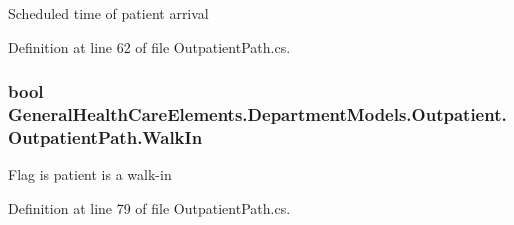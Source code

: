 Scheduled time of patient arrival 



Definition at line 62 of file Outpatient\+Path.\+cs.

\subsubsection[{\texorpdfstring{Walk\+In}{WalkIn}}]{\setlength{\rightskip}{0pt plus 5cm}bool General\+Health\+Care\+Elements.\+Department\+Models.\+Outpatient.\+Outpatient\+Path.\+Walk\+In\hspace{0.3cm}{\ttfamily [get]}}\hypertarget{class_general_health_care_elements_1_1_department_models_1_1_outpatient_1_1_outpatient_path_ac02340661c3d2e0766bf5392171140f8}{}\label{class_general_health_care_elements_1_1_department_models_1_1_outpatient_1_1_outpatient_path_ac02340661c3d2e0766bf5392171140f8}


Flag is patient is a walk-\/in 



Definition at line 79 of file Outpatient\+Path.\+cs.

